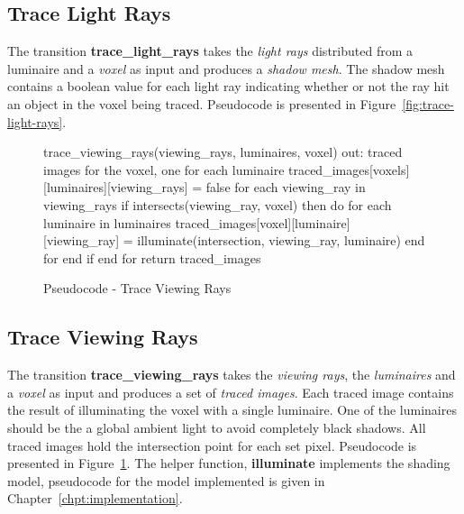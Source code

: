 \subsection{Trace Light Rays}
The transition \textbf{trace\_light\_rays} takes the \emph{light rays} 
distributed from a luminaire and a \emph{voxel} as input and produces a 
\emph{shadow mesh}.  The shadow mesh contains a boolean value for each light ray 
indicating whether or not the ray hit an object in the voxel being traced.  
Pseudocode is presented in Figure~\ref{fig:trace-light-rays}. 

\begin{figure}[!htb]
\begin{algorithm}
trace_viewing_rays(viewing_rays, luminaires, voxel) 
  out: traced images for the voxel, one for each luminaire
  traced_images[voxels][luminaires][viewing_rays] = false
  for each viewing_ray in viewing_rays
    if intersects(viewing_ray, voxel) then do
      for each luminaire in luminaires
        traced_images[voxel][luminaire][viewing_ray] = 
          illuminate(intersection, viewing_ray, luminaire)
      end for end if
  end for
return traced_images
\end{algorithm}
\caption{Pseudocode - Trace Viewing Rays}
\label{fig:trace-viewing-rays}
\end{figure}

\subsection{Trace Viewing Rays}
The transition \textbf{trace\_viewing\_rays} takes the \emph{viewing rays}, the 
\emph{luminaires} and a \emph{voxel} as input and produces a set of \emph{traced 
images}. Each traced image contains the result of illuminating the voxel with a 
single luminaire.  One of the luminaires should be the a global ambient light
to avoid completely black shadows. All traced images hold the intersection point
for each set pixel. Pseudocode is presented in
Figure~\ref{fig:trace-viewing-rays}.  The helper function, \textbf{illuminate}
implements the shading model, pseudocode for the model implemented is given in
Chapter~\ref{chpt:implementation}. 

